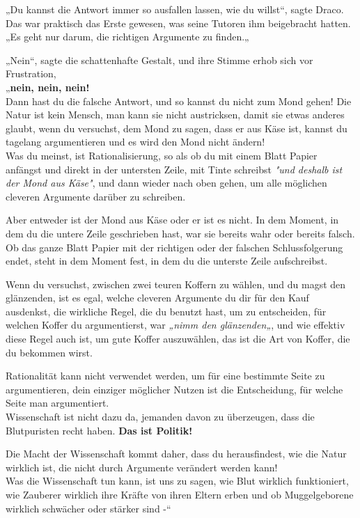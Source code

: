 {„Du kannst die Antwort immer so ausfallen lassen, wie du willst“, sagte Draco.\\ Das war praktisch das Erste gewesen, was seine Tutoren ihm beigebracht hatten.\\ „Es geht nur darum, die richtigen Argumente zu finden.„

„Nein“, sagte die schattenhafte Gestalt, und ihre Stimme erhob sich vor Frustration,\\ „\textbf{nein, nein, nein!}\\ Dann hast du die falsche Antwort, und so kannst du nicht zum Mond gehen! Die Natur ist kein Mensch, man kann sie nicht austricksen, damit sie etwas anderes glaubt, wenn du versuchst, dem Mond zu sagen, dass er aus Käse ist, kannst du tagelang argumentieren und es wird den Mond nicht ändern!\\ Was du meinst, ist Rationalisierung, so als ob du mit einem Blatt Papier anfängst und direkt in der untersten Zeile, mit Tinte schreibst \emph{"und deshalb ist der Mond aus Käse"}, und dann wieder nach oben gehen, um alle möglichen cleveren Argumente darüber zu schreiben.

Aber entweder ist der Mond aus Käse oder er ist es nicht. In dem Moment, in dem du die untere Zeile geschrieben hast, war sie bereits wahr oder bereits falsch.\\ Ob das ganze Blatt Papier mit der richtigen oder der falschen Schlussfolgerung endet, steht in dem Moment fest, in dem du die unterste Zeile aufschreibst.

Wenn du versuchst, zwischen zwei teuren Koffern zu wählen, und du magst den glänzenden, ist es egal, welche cleveren Argumente du dir für den Kauf ausdenkst, die wirkliche Regel, die du benutzt hast, um zu entscheiden, für welchen Koffer du argumentierst, war \emph{„nimm den glänzenden„}, und wie effektiv diese Regel auch ist, um gute Koffer auszuwählen, das ist die Art von Koffer, die du bekommen wirst.

Rationalität kann nicht verwendet werden, um für eine bestimmte Seite zu argumentieren, dein einziger möglicher Nutzen ist die Entscheidung, für welche Seite man argumentiert.\\ Wissenschaft ist nicht dazu da, jemanden davon zu überzeugen, dass die Blutpuristen recht haben. \textbf{Das ist Politik!}

Die Macht der Wissenschaft kommt daher, dass du herausfindest, wie die Natur wirklich ist, die nicht durch Argumente verändert werden kann!\\ Was die Wissenschaft tun kann, ist uns zu sagen, wie Blut wirklich funktioniert, wie Zauberer wirklich ihre Kräfte von ihren Eltern erben und ob Muggelgeborene wirklich schwächer oder stärker sind -“

}
